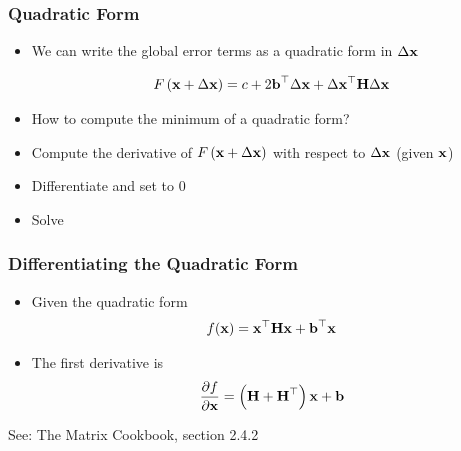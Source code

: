 \begin{frame}
    \frametitle{Quadratic Form}
    
    \begin{itemize}
        \item<1-> We can write the global error terms as a quadratic form in $\Delta \boldsymbol{\mathbf{x}}$
        
        \begin{equation*}
            F\left(\boldsymbol{\mathbf{x}} + \Delta \boldsymbol{\mathbf{x}} \right) = c + 2 \boldsymbol{\mathbf{b}}^{\top} \Delta \boldsymbol{\mathbf{x}} + \Delta \boldsymbol{\mathbf{x}}^{\top} \boldsymbol{\mathbf{H}} \Delta \boldsymbol{\mathbf{x}}
        \end{equation*}
        
        \item<1> \alert{How to compute the minimum of a quadratic form?}
        \item<2-> Compute the derivative of $F\left(\boldsymbol{\mathbf{x}} + \Delta \boldsymbol{\mathbf{x}} \right)$ with respect to $\Delta \boldsymbol{\mathbf{x}}$ (given $\boldsymbol{\mathbf{x}}$)
        \item<2-> Differentiate and set to 0
        \item<2-> Solve
    \end{itemize}

\end{frame}

\begin{frame}
    \frametitle{Differentiating the Quadratic Form}
    
    \begin{itemize}
        \item Given the quadratic form
        \begin{equation*}
            f(\boldsymbol{\mathbf{x}}) = \boldsymbol{\mathbf{x}}^{\top} \boldsymbol{\mathbf{H}} \boldsymbol{\mathbf{x}} + \boldsymbol{\mathbf{b}}^{\top} \boldsymbol{\mathbf{x}}
        \end{equation*}
        \item The first derivative is
        \begin{equation*}
            \dfrac{\partial f}{\partial \boldsymbol{\mathbf{x}}} = \left( \boldsymbol{\mathbf{H}} + \boldsymbol{\mathbf{H}}^{\top} \right) \boldsymbol{\mathbf{x}} + \boldsymbol{\mathbf{b}}
        \end{equation*}
    \end{itemize}
    
    See: The Matrix Cookbook, section 2.4.2
   
\end{frame}

